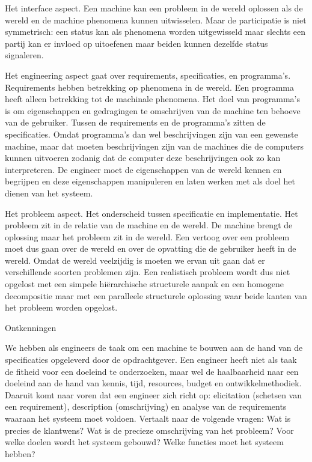 \documentclass{article}
\begin{document}
Het interface aspect. Een machine kan een probleem in de wereld oplossen als de wereld en de machine phenomena kunnen uitwisselen. Maar de participatie is niet symmetrisch: een status kan als phenomena worden uitgewisseld maar slechts een partij kan er invloed op uitoefenen maar beiden kunnen dezelfde status signaleren. 

Het engineering aspect gaat over requirements, specificaties, en programma’s. Requirements hebben betrekking op phenomena in de wereld. Een programma heeft alleen betrekking tot de machinale phenomena. Het doel van programma’s is om eigenschappen en gedragingen te omschrijven van de machine ten behoeve van de gebruiker. Tussen de requirements en de programma’s zitten de specificaties. Omdat programma’s dan wel beschrijvingen zijn van een gewenste machine, maar dat moeten beschrijvingen zijn van de  machines  die de computers kunnen uitvoeren zodanig dat de computer deze beschrijvingen ook zo kan interpreteren. De engineer moet  de eigenschappen van de wereld kennen en begrijpen en deze eigenschappen manipuleren en laten werken met als doel het dienen van het systeem. 

Het probleem aspect. Het onderscheid tussen specificatie en implementatie. Het probleem zit in de relatie van de machine en de wereld. De machine brengt de oplossing maar het probleem zit in de wereld. Een vertoog over een probleem moet dus gaan over de wereld en over de opvatting die de gebruiker heeft in de wereld. Omdat de wereld veelzijdig is moeten we ervan uit gaan dat er verschillende soorten problemen zijn. Een realistisch probleem wordt dus niet opgelost met een simpele hiërarchische structurele aanpak en een homogene decompositie maar met een paralleele structurele oplossing waar beide kanten van het probleem worden opgelost. 

 

Ontkenningen 

We hebben als engineers de taak om een machine te bouwen aan de hand van de specificaties opgeleverd door de opdrachtgever. Een engineer heeft niet als taak de fitheid voor een doeleind te onderzoeken, maar wel de haalbaarheid naar een doeleind aan de hand van kennis, tijd, resources, budget en ontwikkelmethodiek. Daaruit komt naar voren dat een engineer zich richt op: elicitation (schetsen van een requirement), description (omschrijving) en analyse van de requirements waaraan het systeem moet voldoen. Vertaalt naar de volgende vragen: Wat is precies de klantwens?  Wat is de precieze omschrijving van het probleem? Voor welke doelen wordt het systeem gebouwd? Welke functies moet het systeem hebben? 
\end{document}
